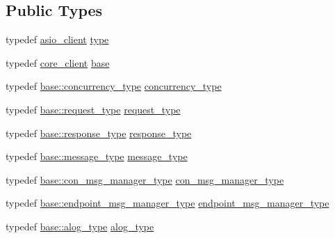 \subsection*{Public Types}
\begin{DoxyCompactItemize}
\item 
typedef \hyperlink{structwebsocketpp_1_1config_1_1asio__client}{asio\+\_\+client} \hyperlink{structwebsocketpp_1_1config_1_1asio__client_a83c2101418dca5389a5d6a6af7351f36}{type}
\item 
typedef \hyperlink{structwebsocketpp_1_1config_1_1core__client}{core\+\_\+client} \hyperlink{structwebsocketpp_1_1config_1_1asio__client_adfbce2c3351334c0b83b8575cf48ac6f}{base}
\item 
typedef \hyperlink{structwebsocketpp_1_1config_1_1core__client_a4efeeb870e648c7405daab92d10fa5d6}{base\+::concurrency\+\_\+type} \hyperlink{structwebsocketpp_1_1config_1_1asio__client_a0443785a3a6e6f8d0f924fad4206b9a8}{concurrency\+\_\+type}
\item 
typedef \hyperlink{structwebsocketpp_1_1config_1_1core__client_a1fd74b16e3add246b1c356f6f14f206b}{base\+::request\+\_\+type} \hyperlink{structwebsocketpp_1_1config_1_1asio__client_ab199fcea968ae7873e81b07bc4cfe0b8}{request\+\_\+type}
\item 
typedef \hyperlink{structwebsocketpp_1_1config_1_1core__client_a5d8d6a90c7f36442a61a615da2ac8dcc}{base\+::response\+\_\+type} \hyperlink{structwebsocketpp_1_1config_1_1asio__client_aa83f5f53ad2530fcf2af691a44ca74c0}{response\+\_\+type}
\item 
typedef \hyperlink{structwebsocketpp_1_1config_1_1core__client_ae370adc4110d5d6c709167462467b11c}{base\+::message\+\_\+type} \hyperlink{structwebsocketpp_1_1config_1_1asio__client_a5148ca616b771b4a701f7a4d9b68cdbf}{message\+\_\+type}
\item 
typedef \hyperlink{structwebsocketpp_1_1config_1_1core__client_ae5d0b586e86a2520bdefe60d61849d37}{base\+::con\+\_\+msg\+\_\+manager\+\_\+type} \hyperlink{structwebsocketpp_1_1config_1_1asio__client_a428558a45b8df29fd19677bd1f302434}{con\+\_\+msg\+\_\+manager\+\_\+type}
\item 
typedef \hyperlink{structwebsocketpp_1_1config_1_1core__client_a1ccd94e4f4d1102cdb81b98284ed1166}{base\+::endpoint\+\_\+msg\+\_\+manager\+\_\+type} \hyperlink{structwebsocketpp_1_1config_1_1asio__client_aaeb34609830b9038bff2bbe3fec9d420}{endpoint\+\_\+msg\+\_\+manager\+\_\+type}
\item 
typedef \hyperlink{structwebsocketpp_1_1config_1_1core__client_a98c19fba0898e3842c001248df82fb2a}{base\+::alog\+\_\+type} \hyperlink{structwebsocketpp_1_1config_1_1asio__client_af6deeb2d0492bb8680b4e030fd201185}{alog\+\_\+type}

\end{DoxyCompactItemize}
